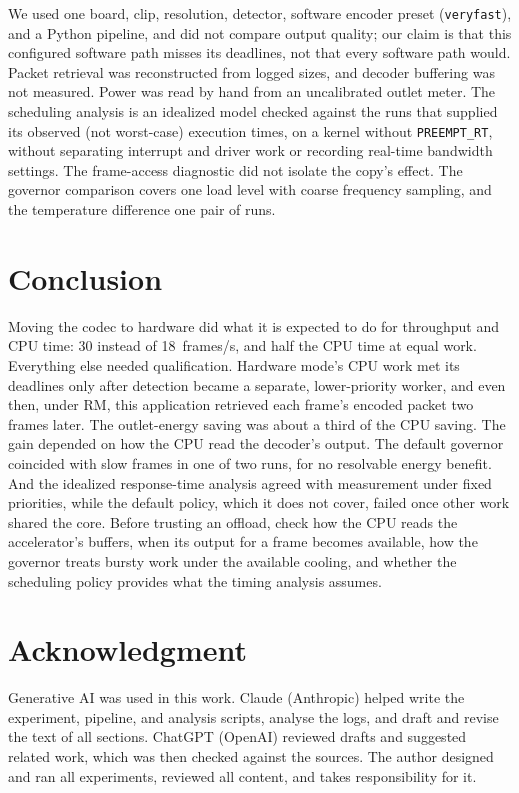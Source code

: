 \documentclass[conference]{IEEEtran}
\begin{document}
We used one board, clip, resolution, detector, software encoder preset (\texttt{veryfast}), and a Python pipeline, and did not compare output quality; our claim is that this configured software path misses its deadlines, not that every software path would. Packet retrieval was reconstructed from logged sizes, and decoder buffering was not measured. Power was read by hand from an uncalibrated outlet meter. The scheduling analysis is an idealized model checked against the runs that supplied its observed (not worst-case) execution times, on a kernel without \texttt{PREEMPT\_RT}, without separating interrupt and driver work or recording real-time bandwidth settings. The frame-access diagnostic did not isolate the copy's effect. The governor comparison covers one load level with coarse frequency sampling, and the temperature difference one pair of runs.

\section{Conclusion}

Moving the codec to hardware did what it is expected to do for throughput and CPU time: 30 instead of 18~frames/s, and half the CPU time at equal work. Everything else needed qualification. Hardware mode's CPU work met its deadlines only after detection became a separate, lower-priority worker, and even then, under RM, this application retrieved each frame's encoded packet two frames later. The outlet-energy saving was about a third of the CPU saving. The gain depended on how the CPU read the decoder's output. The default governor coincided with slow frames in one of two runs, for no resolvable energy benefit. And the idealized response-time analysis agreed with measurement under fixed priorities, while the default policy, which it does not cover, failed once other work shared the core. Before trusting an offload, check how the CPU reads the accelerator's buffers, when its output for a frame becomes available, how the governor treats bursty work under the available cooling, and whether the scheduling policy provides what the timing analysis assumes.

\section*{Acknowledgment}
Generative AI was used in this work. Claude (Anthropic) helped write the experiment, pipeline, and analysis scripts, analyse the logs, and draft and revise the text of all sections. ChatGPT (OpenAI) reviewed drafts and suggested related work, which was then checked against the sources. The author designed and ran all experiments, reviewed all content, and takes responsibility for it.
\end{document}
